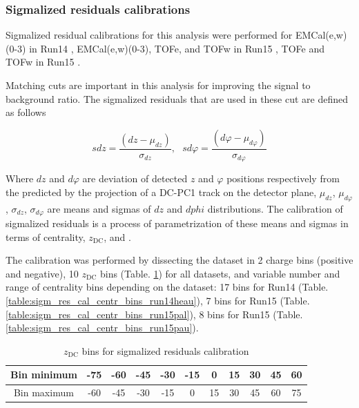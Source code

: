 \subsubsection{Sigmalized residuals calibrations}

Sigmalized residual calibrations for this analysis were performed for EMCal(e,w)(0-3) in Run14 \HeAu, EMCal(e,w)(0-3), TOFe, and TOFw in Run15 \pAl, TOFe and TOFw in Run15 \pAu.

Matching cuts are important in this analysis for improving the signal to background ratio.
The sigmalized residuals that are used in these cut are defined as follows

\begin{equation}
   sdz = \frac{(dz - \mu_{dz})}{\sigma_{dz}}, \ \ \ sd\varphi = \frac{(d\varphi - \mu_{d\varphi})}{\sigma_{d\varphi}}
\end{equation}

Where $dz$ and $d\varphi$ are deviation of detected $z$ and $\varphi$ positions respectively from the predicted by the projection of a DC-PC1 track on the detector plane,
$\mu_{dz}$, $\mu_{d\varphi}$, $\sigma_{dz}$, $\sigma_{d\varphi}$ are means and sigmas of $dz$ and $dphi$ distributions.
The calibration of sigmalized residuals is a process of parametrization of these means and sigmas in terms of centrality, $z_{\text{DC}}$, and \pT. 

The calibration was performed by dissecting the dataset in 2 charge bins (positive and negative), 10 $z_{\text{DC}}$ bins (Table. \ref{table:sigm_res_cal_zdc_bins}) for all datasets, and variable number and range of centrality bins depending on the dataset: 17 bins for Run14 \HeAu (Table. \ref{table:sigm_res_cal_centr_bins_run14heau}), 7 bins for Run15 \pAl (Table. \ref{table:sigm_res_cal_centr_bins_run15pal}), 8 bins for Run15 \pAu (Table. \ref{table:sigm_res_cal_centr_bins_run15pau}).

\begin{table}[h!]
	\centering
	\begin{tabular}{c||c|c|c|c|c|c|c|c|c|c}
      Bin minimum & -75 & -60 & -45 & -30 & -15 & 0 & 15 & 30 & 45 & 60 \\
      \hline
      Bin maximum & -60 & -45 & -30 & -15 & 0 & 15 & 30 & 45 & 60 & 75 \\
	\end{tabular}
   \caption{$z_{\text{DC}}$ bins for sigmalized residuals calibration}
	\label{table:sigm_res_cal_zdc_bins}
\end{table}

